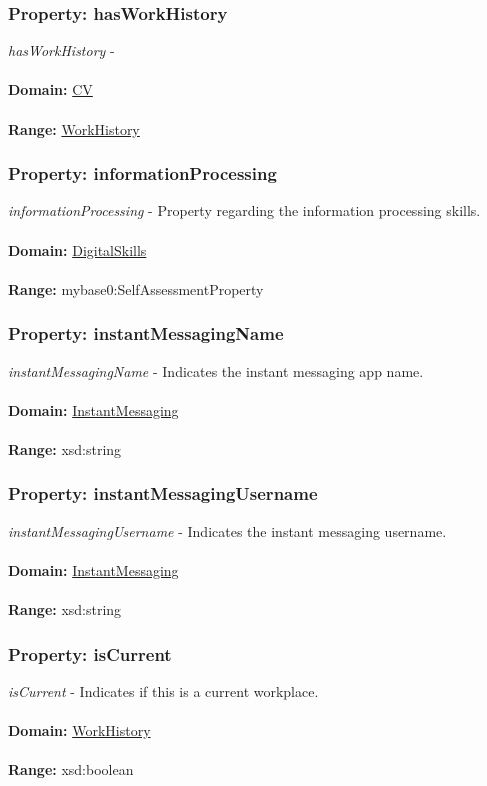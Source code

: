 \documentclass[a4paper,12pt]{article}
\numberwithin{equation}{section}
\begin{document}
\subsubsection{Property: hasWorkHistory}\hypertarget{hasWorkHistory}{}
\textit{hasWorkHistory} - 
\\\\
\textbf{Domain:} \hyperlink{CV}{CV} 
\\\\
\textbf{Range:}  \hyperlink{WorkHistory}{WorkHistory} 

\subsubsection{Property: informationProcessing}\hypertarget{informationProcessing}{}
\textit{informationProcessing} - Property regarding the information processing skills.
\\\\
\textbf{Domain:} \hyperlink{DigitalSkills}{DigitalSkills} 
\\\\
\textbf{Range:}  mybase0:SelfAssessmentProperty

\subsubsection{Property: instantMessagingName}\hypertarget{instantMessagingName}{}
\textit{instantMessagingName} - Indicates the instant messaging app name.
\\\\
\textbf{Domain:} \hyperlink{InstantMessaging}{InstantMessaging} 
\\\\
\textbf{Range:}  xsd:string

\subsubsection{Property: instantMessagingUsername}\hypertarget{instantMessagingUsername}{}
\textit{instantMessagingUsername} - Indicates the instant messaging username.
\\\\
\textbf{Domain:} \hyperlink{InstantMessaging}{InstantMessaging} 
\\\\
\textbf{Range:}  xsd:string

\subsubsection{Property: isCurrent}\hypertarget{isCurrent}{}
\textit{isCurrent} - Indicates if this is a current workplace.
\\\\
\textbf{Domain:} \hyperlink{WorkHistory}{WorkHistory} 
\\\\
\textbf{Range:}  xsd:boolean
\end{document}
